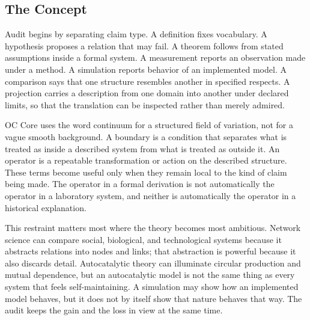 \documentclass[11pt,a4paper,openany]{book}
\begin{document}
\subsection{The Concept}
Audit begins by separating claim type. A definition fixes vocabulary. A hypothesis proposes a relation that may fail. A theorem follows from stated assumptions inside a formal system. A measurement reports an observation made under a method. A simulation reports behavior of an implemented model. A comparison says that one structure resembles another in specified respects. A projection carries a description from one domain into another under declared limits, so that the translation can be inspected rather than merely admired. \cite{kauffman_autocatalytic,raf_networks}\par
OC Core uses the word continuum for a structured field of variation, not for a vague smooth background. A boundary is a condition that separates what is treated as inside a described system from what is treated as outside it. An operator is a repeatable transformation or action on the described structure. These terms become useful only when they remain local to the kind of claim being made. The operator in a formal derivation is not automatically the operator in a laboratory system, and neither is automatically the operator in a historical explanation.\par
This restraint matters most where the theory becomes most ambitious. Network science can compare social, biological, and technological systems because it abstracts relations into nodes and links; that abstraction is powerful because it also discards detail. Autocatalytic theory can illuminate circular production and mutual dependence, but an autocatalytic model is not the same thing as every system that feels self-maintaining. A simulation may show how an implemented model behaves, but it does not by itself show that nature behaves that way. The audit keeps the gain and the loss in view at the same time.\par
\end{document}
